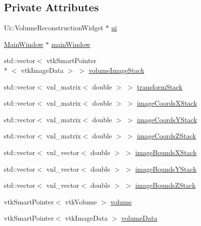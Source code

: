 \subsection*{Private Attributes}
\begin{DoxyCompactItemize}
\item 
Ui\-::\-Volume\-Reconstruction\-Widget $\ast$ \hyperlink{class_volume_reconstruction_widget_afe330d72d1167607d761a6be7f5c4048}{ui}
\item 
\hyperlink{class_main_window}{Main\-Window} $\ast$ \hyperlink{class_volume_reconstruction_widget_a3c4a62c79152059201b1ace97af89691}{main\-Window}
\item 
std\-::vector$<$ vtk\-Smart\-Pointer\\*
$<$ vtk\-Image\-Data $>$ $>$ \hyperlink{class_volume_reconstruction_widget_a521dcefa95fe4f079622c83e162349b5}{volume\-Image\-Stack}
\item 
std\-::vector$<$ vnl\-\_\-matrix$<$ double $>$ $>$ \hyperlink{class_volume_reconstruction_widget_a184f596737a8ba01e74e2acb3843fcfc}{transform\-Stack}
\item 
std\-::vector$<$ vnl\-\_\-matrix$<$ double $>$ $>$ \hyperlink{class_volume_reconstruction_widget_af74830d4db64cc68e46eb49d261f537e}{image\-Coords\-X\-Stack}
\item 
std\-::vector$<$ vnl\-\_\-matrix$<$ double $>$ $>$ \hyperlink{class_volume_reconstruction_widget_a510a59c37345dfc2e0e3593a5384d664}{image\-Coords\-Y\-Stack}
\item 
std\-::vector$<$ vnl\-\_\-matrix$<$ double $>$ $>$ \hyperlink{class_volume_reconstruction_widget_addd1ebae781cf60c4a4dff76bc6b6a2c}{image\-Coords\-Z\-Stack}
\item 
std\-::vector$<$ vnl\-\_\-vector$<$ double $>$ $>$ \hyperlink{class_volume_reconstruction_widget_ac955dfda26333bae884d4dbe1f60a4da}{image\-Bounds\-X\-Stack}
\item 
std\-::vector$<$ vnl\-\_\-vector$<$ double $>$ $>$ \hyperlink{class_volume_reconstruction_widget_a4d5b04312c40280d1b32bd51f65d38b7}{image\-Bounds\-Y\-Stack}
\item 
std\-::vector$<$ vnl\-\_\-vector$<$ double $>$ $>$ \hyperlink{class_volume_reconstruction_widget_a016899517e376967dd75c268c0e4d81c}{image\-Bounds\-Z\-Stack}
\item 
vtk\-Smart\-Pointer$<$ vtk\-Volume $>$ \hyperlink{class_volume_reconstruction_widget_a40d53f5d382c03ff1ea33531f0c90394}{volume}
\item 
vtk\-Smart\-Pointer$<$ vtk\-Image\-Data $>$ \hyperlink{class_volume_reconstruction_widget_a88b81c92ab3f640a7e1e9f8bbf40a2ba}{volume\-Data}

\end{DoxyCompactItemize}
